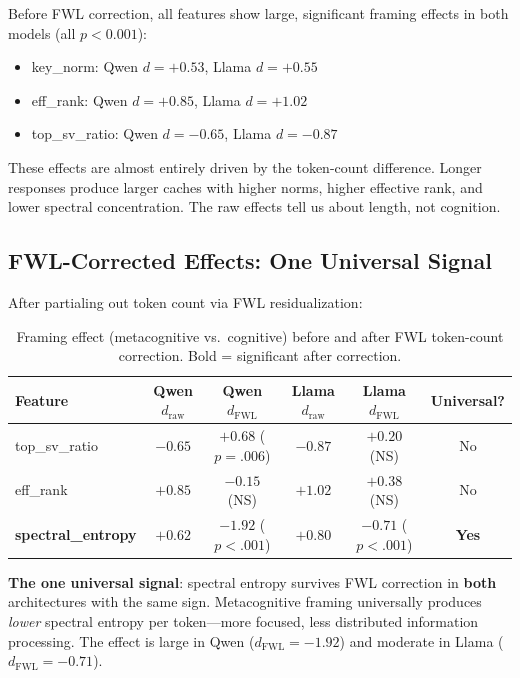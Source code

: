 \documentclass[11pt,a4paper]{article}
\begin{document}
Before FWL correction, all features show large, significant framing effects in both models (all $p < 0.001$):

\begin{itemize}
    \item key\_norm: Qwen $d = +0.53$, Llama $d = +0.55$
    \item eff\_rank: Qwen $d = +0.85$, Llama $d = +1.02$
    \item top\_sv\_ratio: Qwen $d = -0.65$, Llama $d = -0.87$
\end{itemize}

These effects are almost entirely driven by the token-count difference. Longer responses produce larger caches with higher norms, higher effective rank, and lower spectral concentration. The raw effects tell us about length, not cognition.

\subsection{FWL-Corrected Effects: One Universal Signal}

After partialing out token count via FWL residualization:

\begin{table}[H]
\centering
\caption{Framing effect (metacognitive vs.\ cognitive) before and after FWL token-count correction. Bold = significant after correction.}
\label{tab:exp_b_fwl}
\begin{tabular}{lccccc}
\toprule
\textbf{Feature} & \textbf{Qwen $d_{\text{raw}}$} & \textbf{Qwen $d_{\text{FWL}}$} & \textbf{Llama $d_{\text{raw}}$} & \textbf{Llama $d_{\text{FWL}}$} & \textbf{Universal?} \\
\midrule
top\_sv\_ratio     & $-0.65$ & $+0.68$ ($p = .006$)  & $-0.87$ & $+0.20$ (NS)  & No  \\
eff\_rank          & $+0.85$ & $-0.15$ (NS)           & $+1.02$ & $+0.38$ (NS)  & No  \\
\textbf{spectral\_entropy} & $+0.62$ & $\mathbf{-1.92}$ ($p < .001$) & $+0.80$ & $\mathbf{-0.71}$ ($p < .001$) & \textbf{Yes} \\
\bottomrule
\end{tabular}
\end{table}

\textbf{The one universal signal}: spectral entropy survives FWL correction in \textbf{both} architectures with the same sign. Metacognitive framing universally produces \emph{lower} spectral entropy per token---more focused, less distributed information processing. The effect is large in Qwen ($d_{\text{FWL}} = -1.92$) and moderate in Llama ($d_{\text{FWL}} = -0.71$).
\end{document}
